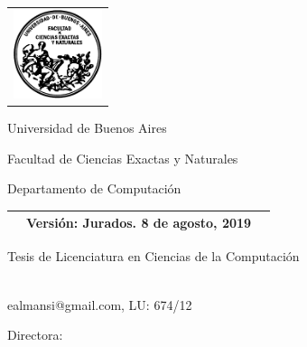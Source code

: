 \newcommand{\HRule}{\rule{\linewidth}{0.2mm}}
%
\thispagestyle{empty}

\begin{center}\leavevmode

\vspace{-2cm}

\begin{tabular}{l}
\includegraphics[width=2.6cm]{logofcen.pdf}
\end{tabular}


{\large \sc Universidad de Buenos Aires

Facultad de Ciencias Exactas y Naturales

Departamento de Computaci\'on}

\vspace{3.0cm}

{
\Large
\begin{tabular}{|p{2cm}cp{2cm}|}
\hline
& Versión: Jurados. 8 de agosto, 2019 &\\
\hline
\end{tabular}
}

\vspace{2.0cm}

\begin{huge}
\textbf{\tituloTesis}
\end{huge}

\vspace{2cm}

{\large Tesis de Licenciatura en Ciencias de la Computaci\'on}

\vspace{1cm}

{
  \Large \autor \\
  \small ealmansi@gmail.com, LU: 674/12
}

\end{center}

\vfill

{\large

{Directora: \director}

\vspace{.2cm}

\lugar
}

\newpage\thispagestyle{empty}
